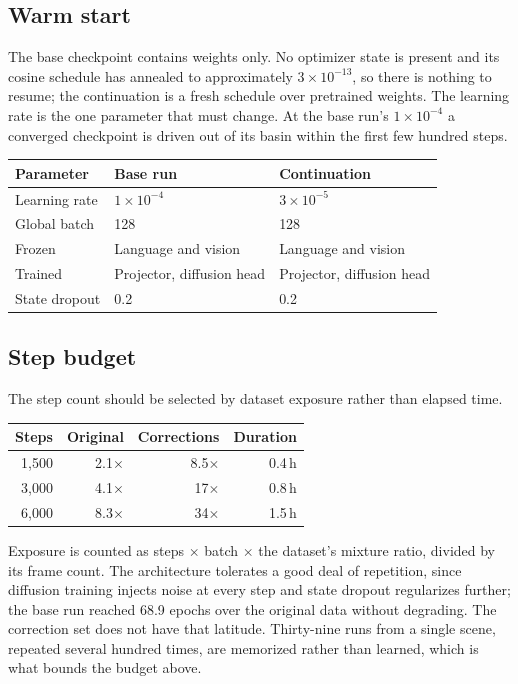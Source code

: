 \documentclass[11pt,a4paper]{article}
\begin{document}
\subsection{Warm start}

The base checkpoint contains weights only. No optimizer state is present and its
cosine schedule has annealed to approximately $3 \times 10^{-13}$, so there is
nothing to resume; the continuation is a fresh schedule over pretrained weights.
The learning rate is the one parameter that must change. At the base run's
$1 \times 10^{-4}$ a converged checkpoint is driven out of its basin within the
first few hundred steps.

\begin{center}
\small
\begin{tabular}{@{}lll@{}}
\toprule
\textbf{Parameter} & \textbf{Base run} & \textbf{Continuation}\\
\midrule
Learning rate  & $1 \times 10^{-4}$ & $3 \times 10^{-5}$\\
Global batch   & 128 & 128\\
Frozen         & Language and vision & Language and vision\\
Trained        & Projector, diffusion head & Projector, diffusion head\\
State dropout  & 0.2 & 0.2\\
\bottomrule
\end{tabular}
\end{center}

\subsection{Step budget}

The step count should be selected by dataset exposure rather than elapsed time.

\begin{center}
\small
\begin{tabular}{@{}rrrr@{}}
\toprule
\textbf{Steps} & \textbf{Original} & \textbf{Corrections} & \textbf{Duration}\\
\midrule
1{,}500  & 2.1$\times$  & 8.5$\times$ & 0.4\,h\\
3{,}000  & 4.1$\times$  & 17$\times$  & 0.8\,h\\
6{,}000  & 8.3$\times$  & 34$\times$  & 1.5\,h\\
\bottomrule
\end{tabular}
\end{center}

Exposure is counted as steps $\times$ batch $\times$ the dataset's mixture
ratio, divided by its frame count. The architecture tolerates a good deal of
repetition, since diffusion training injects noise at every step and state
dropout regularizes further; the base run reached 68.9 epochs over the original
data without degrading. The correction set does not have that latitude.
Thirty-nine runs from a single scene, repeated several hundred times, are
memorized rather than learned, which is what bounds the budget above.
\end{document}

